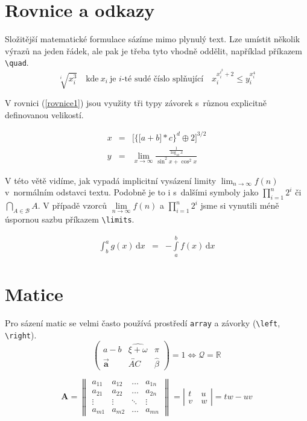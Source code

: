 \documentclass[a4paper, 11pt, twocolumn]{article}
\theoremstyle{definition}
\theoremstyle{plain}
\begin{document}
    \section{Rovnice a odkazy}

    Složitější matematické formulace sázíme mimo plynulý
    text. Lze umístit několik výrazů na jeden řádek, ale pak je
    třeba tyto vhodně oddělit, například příkazem \verb;\quad;.\\
    $$
        \sqrt[i]{x^3_i}\quad
        \textrm{kde}\:x_i\:\textrm{je $i$-té sudé číslo splňující}
        \quad
        x_i^{x_i^{i^2}+2} \le y_i^{x_i^4}
    $$

    V rovnici (\ref{rovnice1}) jsou využity tři typy závorek s~různou explicitně definovanou velikostí.

    \begin{eqnarray} \label{rovnice1}
        x &=& \bigg[\Big\{ \big[a+b\big]*c \Big\}^{d} \oplus 2 \bigg]^{3/2}\\
        y &=& \lim_{x\to\infty}\frac{\frac{1}{\log_{10}x}}{\sin^{2}{x} + \cos^{2}{x}} \nonumber
    \end{eqnarray}

    V této větě vidíme, jak vypadá implicitní vysázení limity $ \lim_{n\to\infty} f(n) $ v~normálním odstavci textu.
    Podobně je to i s~dalšími symboly jako $ \prod_{i=1}^{n} 2^{i} $ či $ \bigcap_{A\in\mathcal{B}} A $.
    V případě vzorců $ \lim\limits_{n\to\infty} f(n) $ a $ \prod\limits_{i=1}^{n} 2^{i} $ jsme si vynutili méně úspornou sazbu příkazem \verb;\limits;.

    \begin{eqnarray}\label{rovnice2}
        \int_{b}^{a} g(x)\,\textrm{d}x &=& - \int\limits_{a}^{b} f(x)\,\textrm{d}x
    \end{eqnarray}

    \section{Matice}

    Pro sázení matic se velmi často používá prostředí \texttt{array} a závorky (\verb;\left;, \verb;\right;).
	$$
		\left(
		\begin{array}{ccc}
		    a-b & \widehat{\xi + \omega} & \pi\\
            \Vec{\mathbf{a}} & \overleftrightarrow{AC} & \hat{\beta}
		\end{array}
		\right)
		= 1 \iff \mathcal{Q} = \mathbb{R}
	$$

	$$
		\mathbf{A} =
		\left\|
		\begin{array}{cccc}
			a_{11} & a_{12} & \ldots & a_{1n} \\
			a_{21} & a_{22} & \ldots & a_{2n} \\
			\vdots & \vdots & \ddots & \vdots \\
			a_{m1} & a_{m2} & \ldots & a_{mn}
		\end{array}
		\right\|
		 =
        \left\vert\begin{array}{cc}
        t & u\\
        v~& w
        \end{array}\right\vert
        = tw - uv
	$$
\end{document}
